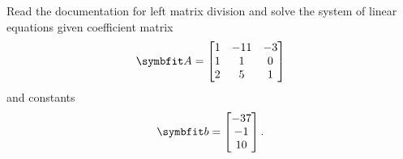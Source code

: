 \documentclass{article}
\begin{document}
\begin{enumerate}[leftmargin=*]
		Read the documentation for left matrix division and
		solve the system of linear equations given coefficient
		matrix
		\begin{equation}
			\mat{A}
			=
			\begin{bmatrix}
				1 & -11 & -3 \\
				1 &   1 &  0 \\
				2 &   5 &  1 \\
			\end{bmatrix}
		\end{equation}
		and constants
		\begin{equation}
			\mat{b}
			=
			\begin{bmatrix}
				-37 \\
				 -1 \\
				 10 \\
			\end{bmatrix}.
		\end{equation}
\end{enumerate}
\end{document}
